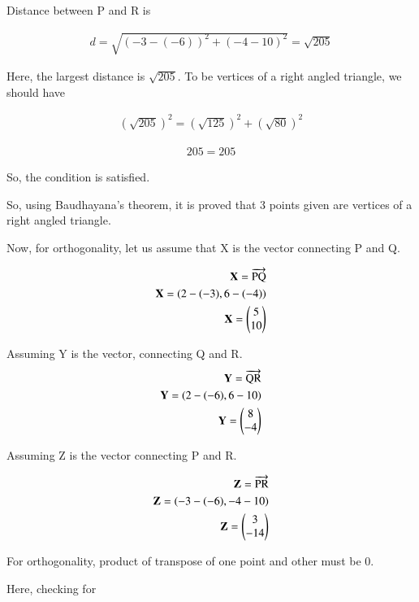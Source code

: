 \documentclass[journal,12pt,twocolumn]{IEEEtran}
\begin{document}
Distance between P and R is 

\begin{align}
d = \sqrt{(-3-(-6))^2+(-4-10)^2}
=\sqrt{205}
\end{align}


Here, the largest distance is $\sqrt{205}$. To be vertices of a right angled triangle, we should have 




\begin{align}
  (\sqrt{205})^2 = (\sqrt{125})^2 + (\sqrt{80})^2
\end{align}


\begin{align}
  205 = 205
\end{align}

So, the condition is satisfied. 

So, using Baudhayana's theorem, it is proved that 3 points given are vertices of a right angled triangle. 

Now, for orthogonality, let us assume that X is the vector connecting P and Q.

\begin{align}
\textbf{X} = \overrightarrow{\text {PQ}}
\\
         \textbf{X}=(2-(-3), 6-(-4))
 \\\textbf{X}= \begin{pmatrix}
5\\
10 
\end{pmatrix}
\end{align}

Assuming Y is the vector, connecting Q and R. 
\begin{align}
\textbf{Y} = \overrightarrow{\text {QR}}
\\
         \textbf{Y}=(2-(-6), 6-10)
 \\\textbf{Y}= \begin{pmatrix}
8\\
-4 
\end{pmatrix}
\end{align}

Assuming Z is the vector connecting P and R. 

\begin{align}
\textbf{Z} = \overrightarrow{\text {PR}}
\\
         \textbf{Z}=(-3-(-6), -4-10)
 \\\textbf{Z}= \begin{pmatrix}
3\\
-14 
\end{pmatrix}
\end{align}

For orthogonality, product of transpose of one point and other must be 0. 

Here, checking for 
\end{document}
